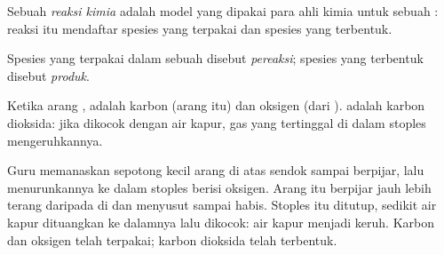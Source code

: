 \begin{definition}\label{def:g7:chemical-reactions:reaction}
Sebuah \emph{reaksi kimia} adalah model yang dipakai
para ahli kimia untuk sebuah : reaksi itu mendaftar
spesies yang terpakai dan spesies yang terbentuk.
\end{definition}

\begin{definition}\label{def:g7:chemical-reactions:reactant}
Spesies yang terpakai dalam sebuah  disebut
\emph{pereaksi}; spesies yang terbentuk disebut
\emph{produk}.
\end{definition}

\begin{example}\label{ex:g7:chemical-reactions:carbon}
Ketika arang ,  adalah karbon (arang itu) dan oksigen
(dari ).  adalah karbon dioksida: jika dikocok dengan air
kapur, gas yang tertinggal di dalam stoples mengeruhkannya.
\end{example}

\begin{inthelab}
Guru memanaskan sepotong kecil arang di atas sendok  sampai
berpijar, lalu menurunkannya ke dalam stoples berisi oksigen. Arang itu
berpijar jauh lebih terang daripada di  dan menyusut sampai habis.
Stoples itu ditutup, sedikit air kapur dituangkan ke dalamnya lalu
dikocok: air kapur menjadi keruh. Karbon dan oksigen telah terpakai;
karbon dioksida telah terbentuk.
\end{inthelab}

